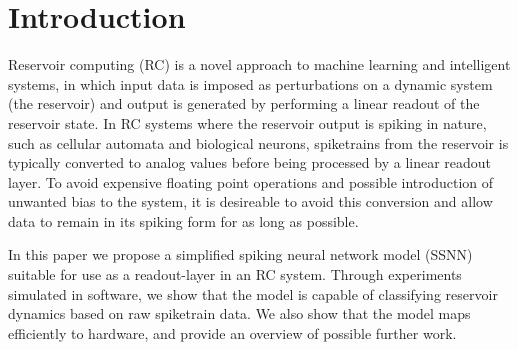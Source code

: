 \section{Introduction}
\label{sec:introduction}

Reservoir computing (RC) is a novel approach to machine learning and intelligent systems, in which input data is imposed as perturbations on a dynamic system (the reservoir) and output is generated by performing a linear readout of the reservoir state.
In RC systems where the reservoir output is spiking in nature, such as cellular automata and biological neurons, spiketrains from the reservoir is typically converted to analog values before being processed by a linear readout layer.
To avoid expensive floating point operations and possible introduction of unwanted bias to the system, it is desireable to avoid this conversion and allow data to remain in its spiking form for as long as possible.

In this paper we propose a simplified spiking neural network model (SSNN) suitable for use as a readout-layer in an RC system.
Through experiments simulated in software, we show that the model is capable of classifying reservoir dynamics based on raw spiketrain data.
We also show that the model maps efficiently to hardware, and provide an overview of possible further work.
